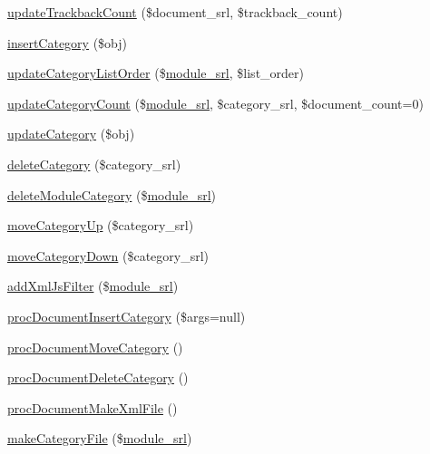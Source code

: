 \begin{DoxyCompactItemize}
\item 
\hyperlink{classdocumentController_ab932f88ad36638495bb5db441737edef}{update\+Trackback\+Count} (\$document\+\_\+srl, \$trackback\+\_\+count)
\item 
\hyperlink{classdocumentController_a5809b6e744e354b7979788f8a4d2d825}{insert\+Category} (\$obj)
\item 
\hyperlink{classdocumentController_a6f3fe3265fd98035ffdd849a03dbe45c}{update\+Category\+List\+Order} (\$\hyperlink{ko_8install_8php_a370bb6450fab1da3e0ed9f484a38b761}{module\+\_\+srl}, \$list\+\_\+order)
\item 
\hyperlink{classdocumentController_a6c2c3cad331e43a7fff774142fe62d00}{update\+Category\+Count} (\$\hyperlink{ko_8install_8php_a370bb6450fab1da3e0ed9f484a38b761}{module\+\_\+srl}, \$category\+\_\+srl, \$document\+\_\+count=0)
\item 
\hyperlink{classdocumentController_a7a4e53cda0765a416280e403b6193b0a}{update\+Category} (\$obj)
\item 
\hyperlink{classdocumentController_ad5840bc0f6ed0040779c5d90d8c327a6}{delete\+Category} (\$category\+\_\+srl)
\item 
\hyperlink{classdocumentController_a8a357bcedee02e8fda122ed24f2a9c1c}{delete\+Module\+Category} (\$\hyperlink{ko_8install_8php_a370bb6450fab1da3e0ed9f484a38b761}{module\+\_\+srl})
\item 
\hyperlink{classdocumentController_a16a00fabad8b270e40d7fa196350280c}{move\+Category\+Up} (\$category\+\_\+srl)
\item 
\hyperlink{classdocumentController_ab6befd47268a1fbfcc56dda3c3a71dc4}{move\+Category\+Down} (\$category\+\_\+srl)
\item 
\hyperlink{classdocumentController_a1fe6155cfd253e19d0583cc74a2cab35}{add\+Xml\+Js\+Filter} (\$\hyperlink{ko_8install_8php_a370bb6450fab1da3e0ed9f484a38b761}{module\+\_\+srl})
\item 
\hyperlink{classdocumentController_aad9894e1432083a62a883568c7b3a42b}{proc\+Document\+Insert\+Category} (\$args=null)
\item 
\hyperlink{classdocumentController_a6bb8b84c1f775b59f74ef8d68ba48f55}{proc\+Document\+Move\+Category} ()
\item 
\hyperlink{classdocumentController_a60d6012f96c71ee539d4152bc2c6f994}{proc\+Document\+Delete\+Category} ()
\item 
\hyperlink{classdocumentController_a749d60be23e4645a5656a82a4fae1962}{proc\+Document\+Make\+Xml\+File} ()
\item 
\hyperlink{classdocumentController_a75dc24adc286b03e6eeb23eb7f771d8f}{make\+Category\+File} (\$\hyperlink{ko_8install_8php_a370bb6450fab1da3e0ed9f484a38b761}{module\+\_\+srl})

\end{DoxyCompactItemize}
